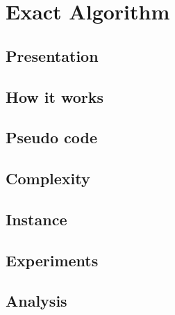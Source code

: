 \documentclass{article}
\begin{document}

    \section{Exact Algorithm}


    \subsection{Presentation}


    \subsection{How it works}


    \subsection{Pseudo code}


    \subsection{Complexity}


    \subsection{Instance}


    \subsection{Experiments}


    \subsection{Analysis    }
\end{document}
